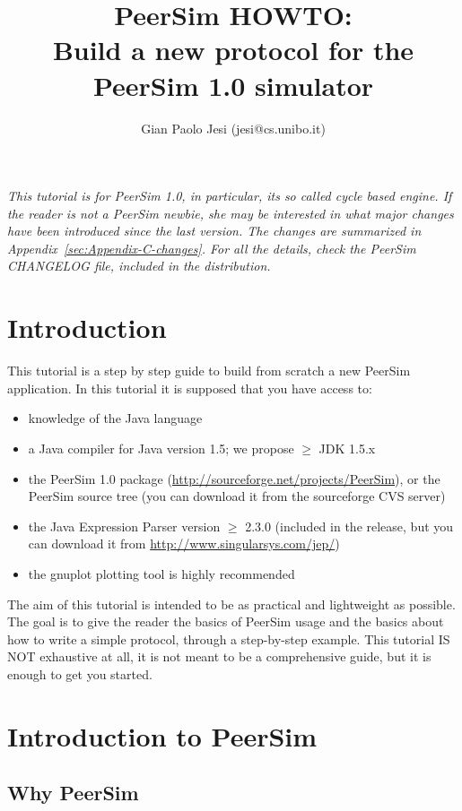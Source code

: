 \documentclass[a4paper,11pt]{article}
\title{PeerSim HOWTO:\\ Build a new protocol for the PeerSim 1.0 simulator}
\author{Gian Paolo Jesi (jesi@cs.unibo.it)}
\begin{document}
\maketitle


\noindent\emph{This tutorial is for PeerSim 1.0, in particular, its so called
cycle based engine.
If the reader is not a PeerSim newbie, she may be
interested in what major changes have been introduced since the last version.
The changes are summarized in Appendix~\ref{sec:Appendix-C-changes}.
For all the details, check the PeerSim CHANGELOG file, included in the
distribution.}

\section{Introduction}


This tutorial is a step by step guide to build from
scratch a new PeerSim application.
In this tutorial it is supposed that you have access to: 

\begin{itemize}
\item knowledge of the Java language
\item a Java compiler for Java version 1.5; we propose $\geq$ JDK 1.5.x
\item the PeerSim 1.0 package (\url{http://sourceforge.net/projects/PeerSim}), 
or the PeerSim source tree (you can download it from the sourceforge CVS server)
\item the Java Expression Parser version $\geq$ 2.3.0
(included in the release, but you can download it from
\url{http://www.singularsys.com/jep/})
\item the gnuplot plotting tool is highly recommended 
\end{itemize}

The aim of this tutorial is intended to be
as practical and lightweight as possible.
The goal is to give the reader the basics
of PeerSim usage and the basics about how to write a simple protocol,
through a step-by-step example.
This tutorial IS NOT exhaustive at all, it is not meant to be a comprehensive
guide, but it is enough to get you started.


\section{Introduction to PeerSim}


\subsection{Why PeerSim}
\end{document}
